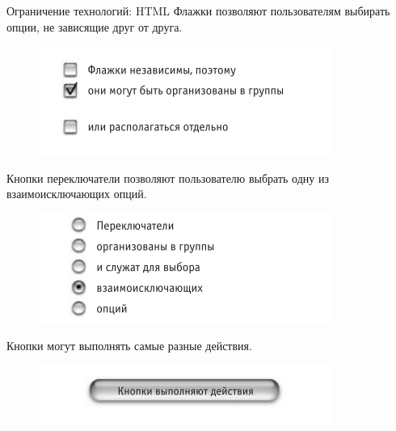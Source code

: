 \documentclass{beamer}
\begin{document}
\begin{frame}[t]{Ограничение технологий: HTML}
Флажки позволяют пользователям выбирать опции, не зависящие друг от друга.
\begin{figure}[h]
\centering
\includegraphics[scale=0.5]{images/lec04-pic05.png}
\end{figure}

Кнопки переключатели позволяют пользователю выбрать одну из взаимоисключающих опций.
\begin{figure}[h]
\centering
\includegraphics[scale=0.5]{images/lec04-pic06.png}
\end{figure}

Кнопки могут выполнять самые разные действия. 
\begin{figure}[h]
\centering
\includegraphics[scale=0.5]{images/lec04-pic10.png}
\end{figure}
\end{frame}
\end{document}
